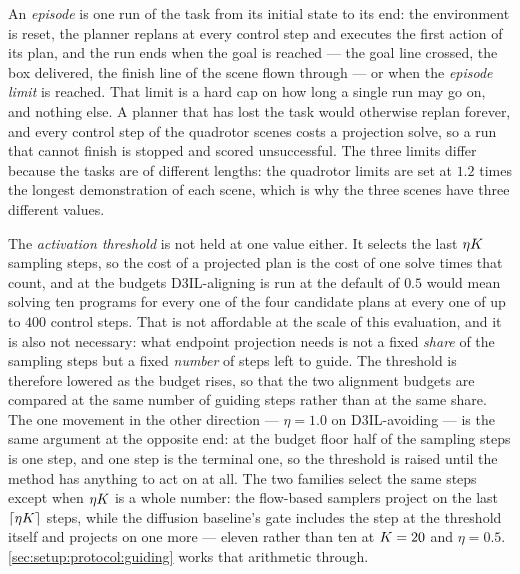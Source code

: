 An \emph{episode} is one run of the task from its initial state to its end: the environment is reset, the
planner replans at every control step and executes the first action of its plan, and the run ends when the
goal is reached --- the goal line crossed, the box delivered, the finish line of the scene flown through
--- or when the \emph{episode limit} is reached. That limit is a hard cap on how long a single run may
go on, and nothing else. A planner that has lost the task would otherwise replan forever, and every control step of the
quadrotor scenes costs a projection solve, so a run that cannot finish is stopped and scored unsuccessful.
The three limits differ because the tasks are of different lengths: the quadrotor limits are set at $1.2$
times the longest demonstration of each scene, which is why the three scenes have three different values.

The \emph{activation threshold} is not held at one value either. It selects the last $\eta K$ sampling
steps, so the cost of a projected plan is the cost of one solve times that count, and at the budgets
D3IL-aligning is run at the default of $0.5$ would mean solving ten programs for every one of the four
candidate plans at every one of up to $400$ control steps. That is not affordable at the scale of this
evaluation, and it is also not necessary: what endpoint projection needs is not a fixed \emph{share} of
the sampling steps but a fixed \emph{number} of steps left to guide. The threshold is therefore lowered as
the budget rises, so that the two alignment budgets are compared at the same number of guiding steps
rather than at the same share. The one movement in the other direction --- $\eta=1.0$ on D3IL-avoiding ---
is the same argument at the opposite end: at the budget floor half of the sampling steps is one step, and
one step is the terminal one, so the threshold is raised until the method has anything to act on at all.
The two families select the same steps except when $\eta K$ is a whole number: the flow-based samplers
project on the last $\lceil\eta K\rceil$ steps, while the diffusion baseline's gate includes the step at
the threshold itself and projects on one more --- eleven rather than ten at $K=20$ and $\eta=0.5$.
\autoref{sec:setup:protocol:guiding} works that arithmetic through.

